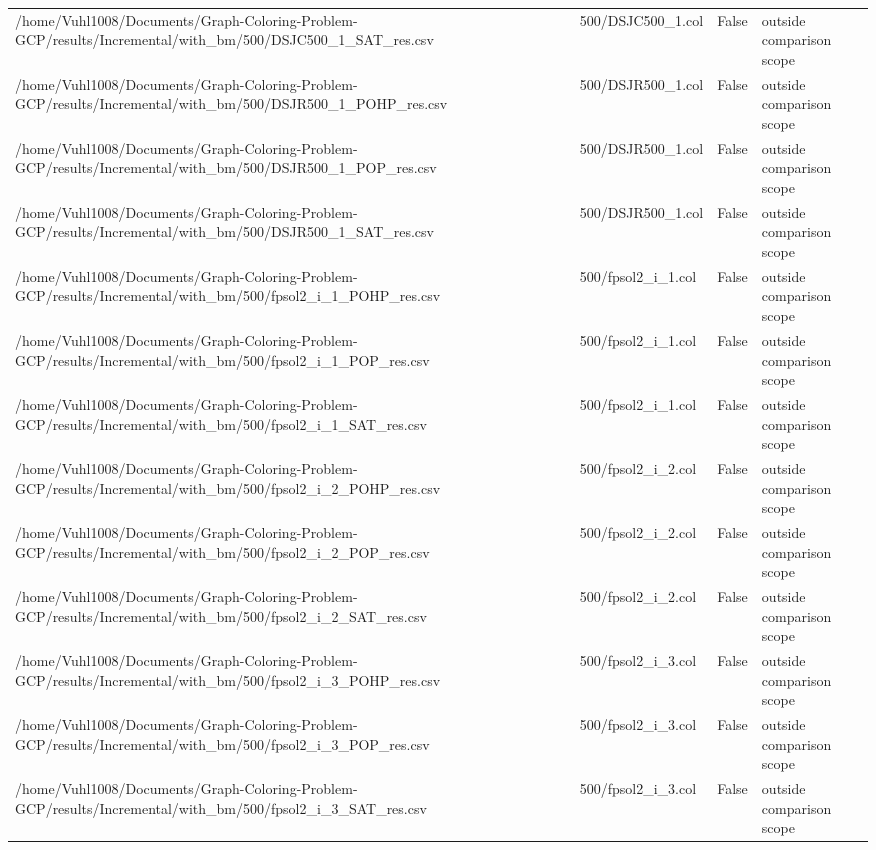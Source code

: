 \begin{table}[htbp]
\begin{tabular}{llll}
/home/Vuhl1008/Documents/Graph-Coloring-Problem-GCP/results/Incremental/with\_bm/500/DSJC500\_1\_SAT\_res.csv & 500/DSJC500\_1.col & False & outside comparison scope \\
/home/Vuhl1008/Documents/Graph-Coloring-Problem-GCP/results/Incremental/with\_bm/500/DSJR500\_1\_POHP\_res.csv & 500/DSJR500\_1.col & False & outside comparison scope \\
/home/Vuhl1008/Documents/Graph-Coloring-Problem-GCP/results/Incremental/with\_bm/500/DSJR500\_1\_POP\_res.csv & 500/DSJR500\_1.col & False & outside comparison scope \\
/home/Vuhl1008/Documents/Graph-Coloring-Problem-GCP/results/Incremental/with\_bm/500/DSJR500\_1\_SAT\_res.csv & 500/DSJR500\_1.col & False & outside comparison scope \\
/home/Vuhl1008/Documents/Graph-Coloring-Problem-GCP/results/Incremental/with\_bm/500/fpsol2\_i\_1\_POHP\_res.csv & 500/fpsol2\_i\_1.col & False & outside comparison scope \\
/home/Vuhl1008/Documents/Graph-Coloring-Problem-GCP/results/Incremental/with\_bm/500/fpsol2\_i\_1\_POP\_res.csv & 500/fpsol2\_i\_1.col & False & outside comparison scope \\
/home/Vuhl1008/Documents/Graph-Coloring-Problem-GCP/results/Incremental/with\_bm/500/fpsol2\_i\_1\_SAT\_res.csv & 500/fpsol2\_i\_1.col & False & outside comparison scope \\
/home/Vuhl1008/Documents/Graph-Coloring-Problem-GCP/results/Incremental/with\_bm/500/fpsol2\_i\_2\_POHP\_res.csv & 500/fpsol2\_i\_2.col & False & outside comparison scope \\
/home/Vuhl1008/Documents/Graph-Coloring-Problem-GCP/results/Incremental/with\_bm/500/fpsol2\_i\_2\_POP\_res.csv & 500/fpsol2\_i\_2.col & False & outside comparison scope \\
/home/Vuhl1008/Documents/Graph-Coloring-Problem-GCP/results/Incremental/with\_bm/500/fpsol2\_i\_2\_SAT\_res.csv & 500/fpsol2\_i\_2.col & False & outside comparison scope \\
/home/Vuhl1008/Documents/Graph-Coloring-Problem-GCP/results/Incremental/with\_bm/500/fpsol2\_i\_3\_POHP\_res.csv & 500/fpsol2\_i\_3.col & False & outside comparison scope \\
/home/Vuhl1008/Documents/Graph-Coloring-Problem-GCP/results/Incremental/with\_bm/500/fpsol2\_i\_3\_POP\_res.csv & 500/fpsol2\_i\_3.col & False & outside comparison scope \\
/home/Vuhl1008/Documents/Graph-Coloring-Problem-GCP/results/Incremental/with\_bm/500/fpsol2\_i\_3\_SAT\_res.csv & 500/fpsol2\_i\_3.col & False & outside comparison scope \\

\end{tabular}
\end{table}
